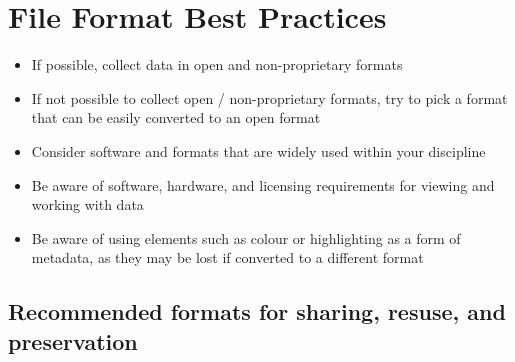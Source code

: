 \documentclass[
]{book}
\providecommand{\tightlist}{%
  \setlength{\itemsep}{0pt}\setlength{\parskip}{0pt}}
\begin{document}
\hypertarget{file-format-best-practices}{%
\section*{File Format Best Practices}\label{file-format-best-practices}}

\begin{itemize}
\tightlist
\item
  If possible, collect data in open and non-proprietary formats
\item
  If not possible to collect open / non-proprietary formats, try to pick a format that can be easily converted to an open format
\item
  Consider software and formats that are widely used within your discipline
\item
  Be aware of software, hardware, and licensing requirements for viewing and working with data
\item
  Be aware of using elements such as colour or highlighting as a form of metadata, as they may be lost if converted to a different format
\end{itemize}

\hypertarget{recommended-formats-for-sharing-resuse-and-preservation}{%
\subsection{Recommended formats for sharing, resuse, and preservation}\label{recommended-formats-for-sharing-resuse-and-preservation}}
\end{document}
